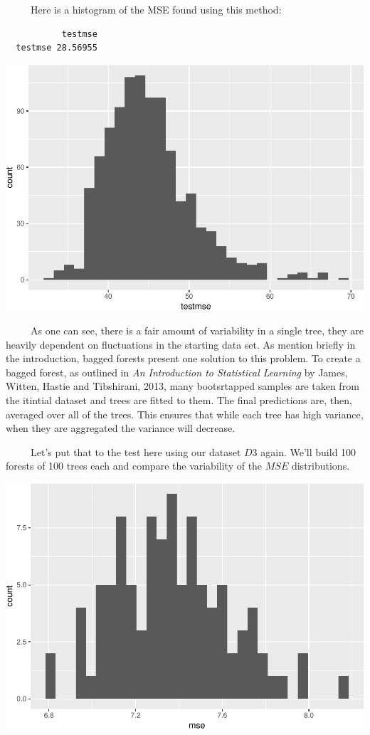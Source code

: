 \documentclass[12pt,twoside]{reedthesis}
\begin{document}
  ~~~~~Here is a histogram of the MSE found using this method:
  
  \begin{verbatim}
           testmse
  testmse 28.56955
  \end{verbatim}
  
  \begin{center}\includegraphics{Thesis_files/figure-latex/unnamed-chunk-2-1} \end{center}
  
  ~~~~~As one can see, there is a fair amount of variability in a single
  tree, they are heavily dependent on fluctuations in the starting data
  set. As mention briefly in the introduction, bagged forests present one
  solution to this problem. To create a bagged forest, as outlined in
  \emph{An Introduction to Statistical Learning} by James, Witten, Hastie
  and Tibshirani, 2013, many bootsrtapped samples are taken from the
  itintial dataset and trees are fitted to them. The final predictions
  are, then, averaged over all of the trees. This ensures that while each
  tree has high variance, when they are aggregated the variance will
  decrease.
  
  ~~~~~Let's put that to the test here using our dataset \(D3\) again.
  We'll build 100 forests of 100 trees each and compare the variability of
  the \(MSE\) distributions.
  
  \begin{center}\includegraphics{Thesis_files/figure-latex/unnamed-chunk-3-1} \end{center}
  
\end{document}
